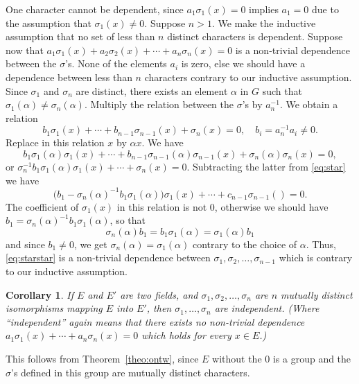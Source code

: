 \documentclass[11pt]{article}
\newtheorem*{coro*}{Corollary}
\theoremstyle{definition}
\begin{document}
One character cannot be dependent, since $a_1 \sigma_1(x) = 0$ implies $a_1 = 0$ due to the assumption that $\sigma_1(x) \not= 0$.
Suppose $n > 1$.
We make the inductive assumption that no set of less than $n$ distinct characters is dependent.
Suppose now that $a_1 \sigma_1(x) + a_2 \sigma_2(x) + \cdots + a_n \sigma_n(x) = 0$ is a non-trivial dependence between the $\sigma$'s.
None of the elements $a_i$ is zero, else we should have a dependence between less than $n$ characters contrary to our inductive assumption.
Since $\sigma_1$ and $\sigma_n$ are distinct, there exists an element $\alpha$ in $G$ such that $\sigma_1(\alpha) \not= \sigma_n(\alpha)$.
Multiply the relation between the $\sigma$'s by $a_n^{-1}$.
We obtain a relation
\begin{equation}
\label{eq:star}
b_1 \sigma_1(x) + \cdots + b_{n-1} \sigma_{n-1}(x) + \sigma_n(x) = 0,
\quad
b_i = a_n^{-1} a_i \not= 0.
\tag{$*$}
\end{equation}
Replace in this relation $x$ by $\alpha x$. We have
\[
b_1 \sigma_1(\alpha) \sigma_1(x) 
+ \cdots 
+ b_{n-1} \sigma_{n-1} (\alpha) \sigma_{n-1}(x) 
+ \sigma_n(\alpha) \sigma_n(x) = 0,
\]
or $\sigma_n^{-1} b_1 \sigma_1(\alpha) \sigma_1(x) + \cdots + \sigma_n(x) = 0$.
Subtracting the latter from \eqref{eq:star} we have
\begin{equation}
\label{eq:starstar}
\bigl(b_1 - \sigma_n(\alpha)^{-1}b_1 \sigma_1(\alpha)\bigr) \sigma_1(x)
+ \cdots
+ c_{n-1} \sigma_{n-1}() = 0.
\tag{$**$}
\end{equation}
The coefficient of $\sigma_1(x)$ in this relation is not 0, otherwise we should have $b_1 = \sigma_n(\alpha)^{-1}b_1\sigma_1(\alpha)$, so that
\[
\sigma_n(\alpha) b_1 = b_1 \sigma_1(\alpha) = \sigma_1(\alpha)b_1
\]
and since $b_1 \not= 0$, we get $\sigma_n(\alpha) = \sigma_1(\alpha)$ contrary to the choice of $\alpha$.
Thus, \eqref{eq:starstar} is a non-trivial dependence between $\sigma_1, \sigma_2, \ldots, \sigma_{n-1}$ which is contrary to our inductive assumption.


\begin{coro*}
If $E$ and $E'$ are two fields, and $\sigma_1, \sigma_2, \ldots, \sigma_n$ are $n$ mutually distinct isomorphisms mapping $E$ into $E'$, then $\sigma_1, \ldots, \sigma_n$ are independent.
(Where ``independent'' again means that there exists no non-trivial dependence $a_1 \sigma_1(x) + \cdots + a_n \sigma_n(x) = 0$ which holds for every $x \in E$.)
\end{coro*}


This follows from Theorem~\ref{theo:ontw}, since $E$ without the 0 is a group and the $\sigma$'s defined in this group are mutually distinct characters.
\end{document}
